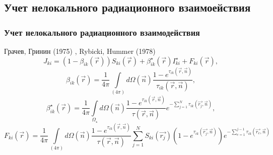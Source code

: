 \documentclass{beamer}
\begin{document}

\subsection[Нелокальное взаимодействие]{Учет нелокального радиационного взаимоействия}

\begin{frame}
\frametitle{Учет нелокального радиационного взаимодействия}
Грачев, Гринин (1975)	, Rybicki, Hummer (1978) 
\begin{equation} 
J_{ki} = (1-\beta_{ik}(\vec{r}))S_{ki}(\vec{r}) + \beta_{ik}^\star(\vec{r})I^\star_{ki} + F_{ki}(\vec{r}), 
\end{equation}
\begin{equation} \label{eq:beta} \nonumber
\beta_{ik}(\vec{r}) = \frac{1}{4\pi}\int\limits_{(4\pi)} d\Omega(\vec{n})\frac{1-e^{\tau_{ik}(\vec{r},\vec{n})}}{\tau_{ik}(\vec{r},\vec{n})}, 
\end{equation}
\begin{equation} \label{eq:starbeta} \nonumber
\beta_{ik}^\star(\vec{r}) = \frac{1}{4\pi}\int\limits_{\Omega_\star} d\Omega(\vec{n})\frac{1-e^{\tau_{ik}(\vec{r},\vec{n})}}{\tau(\vec{r},\vec{n})}e^{-\sum_{j=1}^N\tau_{ik}(\vec{r_j},\vec{n})},
\end{equation}
\begin{equation} \label{eq:CPF} \nonumber
F_{ki}(\vec{r}) = \frac{1}{4\pi}\int\limits_{(4\pi)} d\Omega(\vec{n})\frac{1-e^{\tau_{ik}(\vec{r},\vec{n})}}{\tau(\vec{r},\vec{n})}\sum\limits_{j=1}^N S_{ki}(\vec{r_j}) (1-e^{\tau_{ik}(\vec{r_j},\vec{n})}) e^{-\sum_{e=1}^{j-1}\tau_{ik}(\vec{r_e},\vec{n})}
\end{equation}
\end{frame}
\end{document}
